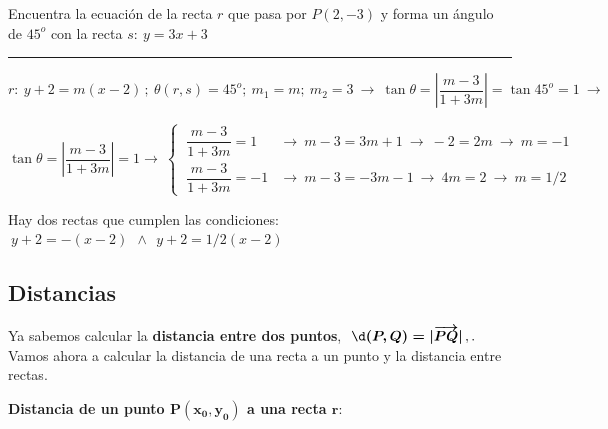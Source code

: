 \vspace{5mm}
\begin{miejercicio}

Encuentra la ecuación de la recta $r$ que pasa por $P(2,-3)$ y forma un ángulo de $45^o$ con la recta $s:\ y=3x+3$

\rule{200pt}{0.1pt}

\vspace{2mm} $r:\ y+2=m(x-2)\, ; \ \theta(r,s)=45^o;\ m_1=m;\ m_2=3 \ \to \ \tan \theta=\left| \dfrac{m-3}{1+3m} \right|=\tan 45^o =1 \ \to $ 	

\vspace{2mm} $\tan \theta=\left| \dfrac{m-3}{1+3m} \right|=1 \to \ \begin{cases}
 \ 	\dfrac{m-3}{1+3m} =1 &\to \ m-3=3m+1 \ \to \ -2=2m \ \to \ m=-1
 \\
 \ \dfrac{m-3}{1+3m} =-1 &\to \ m-3=-3m-1 \ \to \ 4m=2 \ \to \ m=1/2
 \end{cases}$
 
 \vspace{2mm} Hay dos rectas que cumplen las condiciones: $ \ y+2=-(x-2) \ \ \wedge \ \ y+2=1/2(x-2)$

\end{miejercicio}


\vspace{5mm}
\subsection{Distancias}
\vspace{0.5cm}

Ya sabemos calcular la \textbf{distancia entre dos puntos}, $\ \boldsymbol{ \d(P,Q)=|\overrightarrow{PQ}| } \, ,. \ $ Vamos ahora a calcular la distancia de una recta a un punto y la distancia entre rectas.

\vspace{5mm}
\begin{large}
\textbf{Distancia de un punto $\boldsymbol{P(x_0,y_0)}$ a una recta $\boldsymbol{r}$}:	
\end{large}

